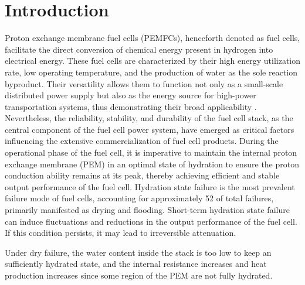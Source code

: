 \section{Introduction}
Proton exchange membrane fuel cells (PEMFCs), henceforth denoted as fuel cells, facilitate the direct conversion of chemical energy present in hydrogen into electrical energy.
These fuel cells are characterized by their high energy utilization rate, low operating temperature, and the production of water as the sole reaction byproduct.
Their versatility allows them to function not only as a small-scale distributed power supply but also as the energy source for high-power transportation systems, thus demonstrating their broad applicability \cite{sharafOverviewFuelCell2014} .
Nevertheless, the reliability, stability, and durability of the fuel cell stack, as the central component of the fuel cell power system, have emerged as critical factors influencing the extensive commercialization of fuel cell products.
During the operational phase of the fuel cell, it is imperative to maintain the internal proton exchange membrane (PEM) in an optimal state of hydration to ensure the proton conduction ability remains at its peak, thereby achieving efficient and stable output performance of the fuel cell. Hydration state failure is the most prevalent failure mode of fuel cells, accounting for approximately 52 of total failures, primarily manifested as drying and flooding. Short-term hydration state failure can induce fluctuations and reductions in the output performance of the fuel cell. If this condition persists, it may lead to irreversible attenuation.
\par
Under dry failure, the water content inside the stack is too low to keep an sufficiently hydrated state,
and the internal resistance increases and heat production increases since some region of the PEM are not fully hydrated.
